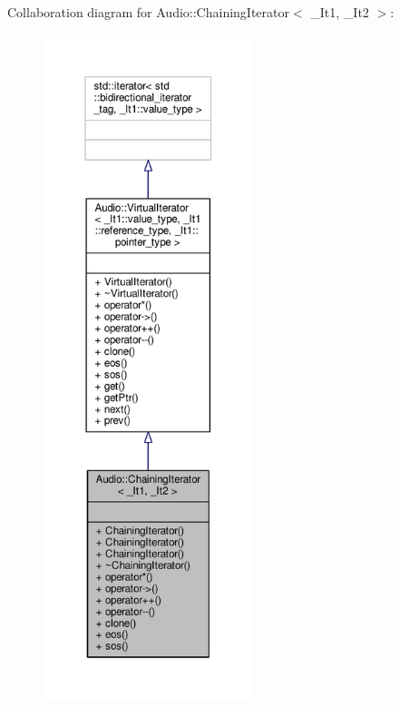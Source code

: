 Collaboration diagram for Audio\+:\+:Chaining\+Iterator$<$ \+\_\+\+It1, \+\_\+\+It2 $>$\+:
\nopagebreak
\begin{figure}[H]
\begin{center}
\leavevmode
\includegraphics[height=550pt]{d6/d4b/classAudio_1_1ChainingIterator__coll__graph}
\end{center}
\end{figure}
